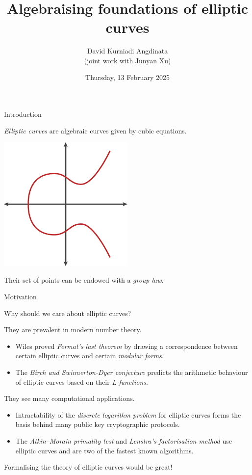 \documentclass[10pt]{beamer}
\title{Algebraising foundations of elliptic curves}
\author{David Kurniadi Angdinata \\ (joint work with Junyan Xu)}
\institute{London School of Geometry and Number Theory}
\date{Thursday, 13 February 2025}
\begin{document}
\frame{\titlepage}

\begin{frame}[t]{Introduction}

\emph{Elliptic curves} are algebraic curves given by cubic equations.

\begin{center}
\includegraphics[width=0.5\textwidth]{ellipticcurve.png}
\end{center}

Their set of points can be endowed with a \emph{group law}.

\end{frame}

\begin{frame}[t]{Motivation}

Why should we care about elliptic curves?

\pause

\vspace{0.5cm} They are prevalent in modern number theory.
\begin{itemize}
\item Wiles proved \emph{Fermat's last theorem} by drawing a correspondence between certain elliptic curves and certain \emph{modular forms}.
\item The \emph{Birch and Swinnerton-Dyer conjecture} predicts the arithmetic behaviour of elliptic curves based on their \emph{L-functions}.
\end{itemize}

\pause

\vspace{0.5cm} They see many computational applications.
\begin{itemize}
\item Intractability of the \emph{discrete logarithm problem} for elliptic curves forms the basis behind many public key cryptographic protocols.
\item The \emph{Atkin--Morain primality test} and \emph{Lenstra's factorisation method} use elliptic curves and are two of the fastest known algorithms.
\end{itemize}

\vspace{0.5cm} Formalising the theory of elliptic curves would be great!

\end{frame}
\end{document}
